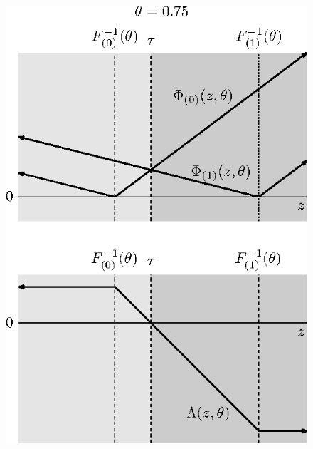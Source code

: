 \begin{figure}[ht]
\begin{minipage}[t]{0.49\linewidth}
    \includegraphics{phi-lambda-0-75}
  \end{minipage}
  
\end{figure}



